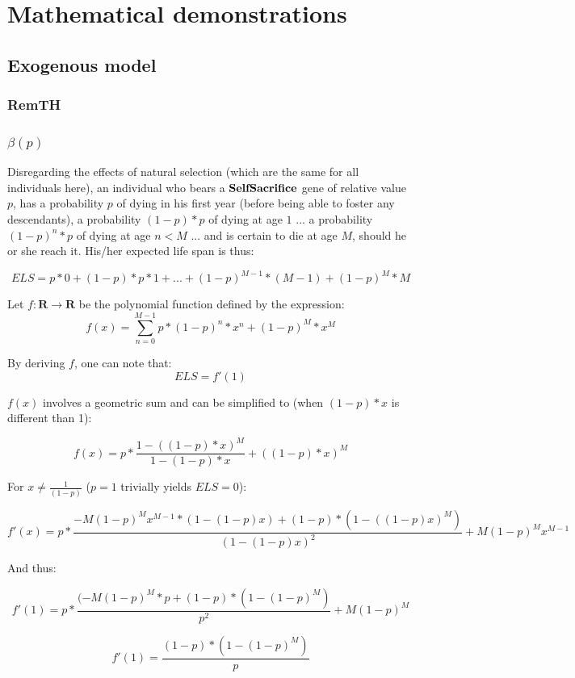 \documentclass[a4paper,12pt]{article}
\begin{document}
\section{Mathematical demonstrations}

\subsection{Exogenous model}
\subsubsection{RemTH}
\subsubsection{$\beta(p)$}
\label{beta}

Disregarding the effects of natural selection (which are the same for all individuals here),
 an individual who bears a $\bf{SelfSacrifice}$ gene of relative value $p$, has a probability $p$ of dying in his first year
 (before being able to foster any descendants), a probability $(1-p)*p$ of dying at age $1$ ...
 a probability $(1-p)^{n}*p$ of dying at age $n<M$ ... and is certain to die at age $M$, should
 he or she reach it. His/her expected life span is thus:

 \[ ELS = p*0 + (1-p)*p*1 + ... + (1-p)^{M-1}*(M-1) + (1-p)^M*M \]

Let $f \colon \mathbf{R} \to \mathbf{R}$ be the polynomial function defined by the expression:
\[ f(x) = \sum_{n=0}^{M-1} p*(1-p)^n*x^n + (1-p)^M*x^M \]

By deriving $f$, one can note that:
\begin{equation}
    ELS = f'(1)
\label{eq_ELS_f}
\end{equation}

$f(x)$ involves a geometric sum and can be simplified to (when $(1-p)*x$ is different than 1):

\[ f(x) = p* \frac{1 - ((1-p)*x)^M}{1-(1-p)*x} + ((1-p)*x)^M \]

For $x\neq\frac{1}{(1-p)}$ ($p=1$ trivially yields $ELS=0$):

\[ f'(x) = p * \frac{-M(1-p)^Mx^{M-1}*(1-(1-p)x) + (1-p)*(1-((1-p)x)^M)}{(1-(1-p)x)^2} + M(1-p)^Mx^{M-1} \]

And thus:

\[f'(1) = p * \frac{(-M(1-p)^M*p + (1-p)*(1-(1-p)^M)}{p^2} + M(1-p)^M \]

\begin{equation}
    f'(1) = \frac{(1-p)*(1-(1-p)^M)}{p}
\label{eq_f'}
\end{equation}
\end{document}
